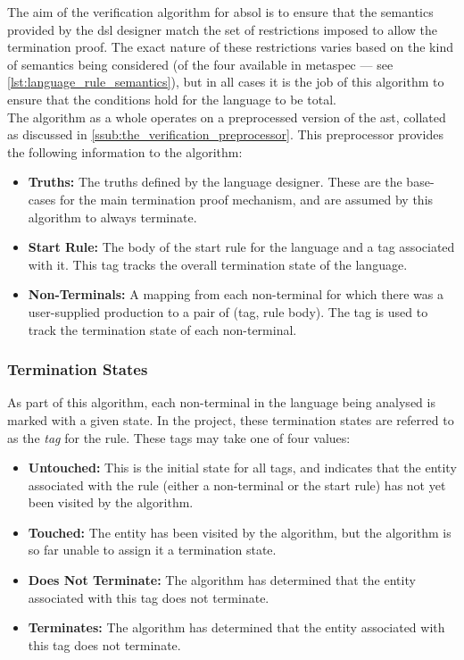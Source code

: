 The aim of the verification algorithm for \gls{absol} is to ensure that the semantics provided by the \gls{dsl} designer match the set of restrictions imposed to allow the termination proof. 
The exact nature of these restrictions varies based on the kind of semantics being considered (of the four available in \gls{metaspec} --- see \autoref{lst:language_rule_semantics}), but in all cases it is the job of this algorithm to ensure that the conditions hold for the language to be total. \\

The algorithm as a whole operates on a preprocessed version of the \gls{ast}, collated as discussed in \autoref{ssub:the_verification_preprocessor}. 
This preprocessor provides the following information to the algorithm:
\begin{itemize}
    \item \textbf{Truths:} The truths defined by the language designer.
    These are the base-cases for the main termination proof mechanism, and are assumed by this algorithm to always terminate.
    \item \textbf{Start Rule:} The body of the start rule for the language and a tag associated with it.
    This tag tracks the overall termination state of the language.
    \item \textbf{Non-Terminals:} A mapping from each non-terminal for which there was a user-supplied production to a pair of (tag, rule body).
    The tag is used to track the termination state of each non-terminal. 
\end{itemize}

\subsubsection{Termination States} %
\label{ssub:termination_states}
As part of this algorithm, each non-terminal in the language being analysed is marked with a given state.
In the project, these termination states are referred to as the \textit{tag} for the rule.
These tags may take one of four values:
\begin{itemize}
    \item \textbf{Untouched:} This is the initial state for all tags, and indicates that the entity associated with the rule (either a non-terminal or the start rule) has not yet been visited by the algorithm.
    \item \textbf{Touched:} The entity has been visited by the algorithm, but the algorithm is so far unable to assign it a termination state.
    \item \textbf{Does Not Terminate:} The algorithm has determined that the entity associated with this tag does not terminate. 
    \item \textbf{Terminates:} The algorithm has determined that the entity associated with this tag does not terminate.
\end{itemize}

